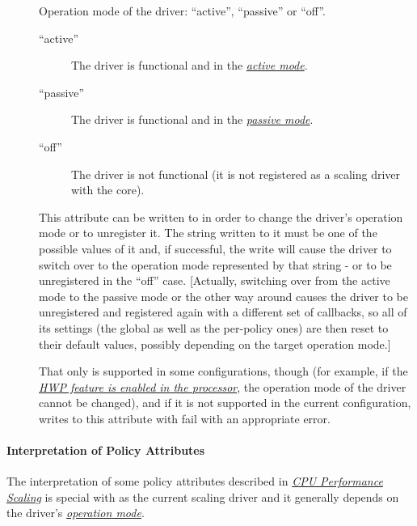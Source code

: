 \documentclass[a4paper,8pt,english]{sphinxmanual}
\begin{document}
\label{admin-guide/pm/intel_pstate:status-attr}\begin{description}
\item[{}] \leavevmode
Operation mode of the driver: ``active'', ``passive'' or ``off''.
\begin{description}
\item[{``active''}] \leavevmode
The driver is functional and in the {\hyperref[admin\string-guide/pm/intel_pstate:active\string-mode]{\emph{active mode}}}\label{admin-guide/pm/intel_pstate:active-mode}.

\item[{``passive''}] \leavevmode
The driver is functional and in the {\hyperref[admin\string-guide/pm/intel_pstate:passive\string-mode]{\emph{passive mode}}}\label{admin-guide/pm/intel_pstate:passive-mode}.

\item[{``off''}] \leavevmode
The driver is not functional (it is not registered as a scaling
driver with the  core).

\end{description}

This attribute can be written to in order to change the driver's
operation mode or to unregister it.  The string written to it must be
one of the possible values of it and, if successful, the write will
cause the driver to switch over to the operation mode represented by
that string - or to be unregistered in the ``off'' case.  {[}Actually,
switching over from the active mode to the passive mode or the other
way around causes the driver to be unregistered and registered again
with a different set of callbacks, so all of its settings (the global
as well as the per-policy ones) are then reset to their default
values, possibly depending on the target operation mode.{]}

That only is supported in some configurations, though (for example, if
the {\hyperref[admin\string-guide/pm/intel_pstate:active\string-mode\string-with\string-hwp]{\emph{HWP feature is enabled in the processor}}}\label{admin-guide/pm/intel_pstate:active-mode-with-hwp},
the operation mode of the driver cannot be changed), and if it is not
supported in the current configuration, writes to this attribute with
fail with an appropriate error.

\end{description}


\paragraph{Interpretation of Policy Attributes}
\label{admin-guide/pm/intel_pstate:interpretation-of-policy-attributes}
The interpretation of some  policy attributes described in
{\hyperref[admin\string-guide/pm/cpufreq::doc]{\emph{\emph{CPU Performance Scaling}}}} is special with  as the current scaling driver
and it generally depends on the driver's {\hyperref[admin\string-guide/pm/intel_pstate:operation\string-modes]{\emph{operation mode}}}\label{admin-guide/pm/intel_pstate:operation-modes}.
\end{document}
